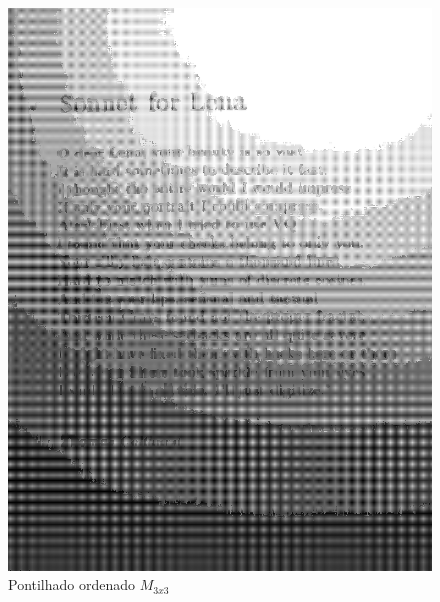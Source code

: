 \documentclass{article}
\begin{document}
\begin{figure}[!htb]
\begin{minipage}{0.48\textwidth}
      \includegraphics[width=.99\linewidth]{results/image_1_soneto.png}
      \caption{Pontilhado ordenado $ M_{3x3}$ }\label{Fig:soneto2}
    \end{minipage}
 \end{figure}
\end{document}
